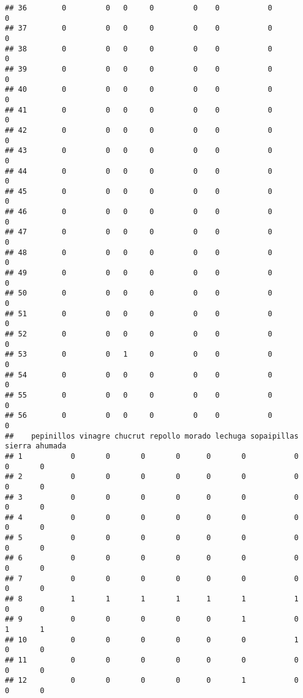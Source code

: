 \documentclass[
]{article}
\begin{document}
\begin{verbatim}
## 36        0         0   0     0         0    0           0          0
## 37        0         0   0     0         0    0           0          0
## 38        0         0   0     0         0    0           0          0
## 39        0         0   0     0         0    0           0          0
## 40        0         0   0     0         0    0           0          0
## 41        0         0   0     0         0    0           0          0
## 42        0         0   0     0         0    0           0          0
## 43        0         0   0     0         0    0           0          0
## 44        0         0   0     0         0    0           0          0
## 45        0         0   0     0         0    0           0          0
## 46        0         0   0     0         0    0           0          0
## 47        0         0   0     0         0    0           0          0
## 48        0         0   0     0         0    0           0          0
## 49        0         0   0     0         0    0           0          0
## 50        0         0   0     0         0    0           0          0
## 51        0         0   0     0         0    0           0          0
## 52        0         0   0     0         0    0           0          0
## 53        0         0   1     0         0    0           0          0
## 54        0         0   0     0         0    0           0          0
## 55        0         0   0     0         0    0           0          0
## 56        0         0   0     0         0    0           0          0
##    pepinillos vinagre chucrut repollo morado lechuga sopaipillas sierra ahumada
## 1           0       0       0       0      0       0           0      0       0
## 2           0       0       0       0      0       0           0      0       0
## 3           0       0       0       0      0       0           0      0       0
## 4           0       0       0       0      0       0           0      0       0
## 5           0       0       0       0      0       0           0      0       0
## 6           0       0       0       0      0       0           0      0       0
## 7           0       0       0       0      0       0           0      0       0
## 8           1       1       1       1      1       1           1      0       0
## 9           0       0       0       0      0       1           0      1       1
## 10          0       0       0       0      0       0           1      0       0
## 11          0       0       0       0      0       0           0      0       0
## 12          0       0       0       0      0       1           0      0       0

\end{verbatim}
\end{document}
